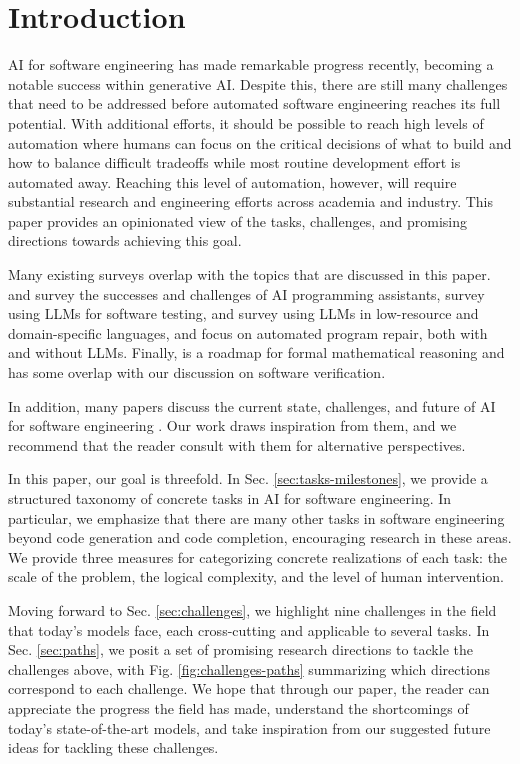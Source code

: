 \section{Introduction}

AI for software engineering has made remarkable progress recently, becoming a notable success within generative AI.
Despite this, there are still many challenges that need to be addressed before automated software engineering reaches its full potential. With additional efforts, it should be possible to reach high levels of automation where humans can focus on the critical decisions of what to build and how to balance difficult tradeoffs while most routine development effort is automated away. Reaching this level of automation, however, will require substantial research and engineering efforts across academia and industry. This paper provides an opinionated view of the tasks, challenges, and promising directions towards achieving this goal.
%
%
%

Many existing surveys overlap with the topics that are discussed in this paper. \citet{liang2024large} and \citet{sergeyuk2025using} survey the successes and challenges of AI programming assistants, \citep{wang2024software} survey using LLMs for software testing, and \citet{joel2024survey} survey using LLMs in low-resource and domain-specific languages, and \citet{zhang2023survey} focus on automated program repair, both with and without LLMs. Finally, \citet{yang2024formal} is a roadmap for formal mathematical reasoning and has some overlap with our discussion on software verification.

In addition, many papers discuss the current state, challenges, and future of AI for software engineering \citep{fan2023large, ozkaya2023application, wong2023natural, zheng2023survey, hou2024large, jin2024llms, wan2024deep, roychoudhury2025ai}. Our work draws inspiration from them, and we recommend that the reader consult with them for alternative perspectives. 

In this paper, our goal is threefold. In Sec. \ref{sec:tasks-milestones}, we provide a structured taxonomy of concrete tasks in AI for software engineering. In particular, we emphasize that there are many other tasks in software engineering beyond code generation and code completion, encouraging research in these areas. We provide three measures for categorizing concrete realizations of each task: the scale of the problem, the logical complexity, and the level of human intervention. 

Moving forward to Sec. \ref{sec:challenges}, we highlight nine challenges in the field that today's models face, each cross-cutting and applicable to several tasks. In Sec. \ref{sec:paths}, we posit a set of promising research directions to tackle the challenges above, with Fig. \ref{fig:challenges-paths} summarizing which directions correspond to each challenge. We hope that through our paper, the reader can appreciate the progress the field has made, understand the shortcomings of today's state-of-the-art models, and take inspiration from our suggested future ideas for tackling these challenges.


